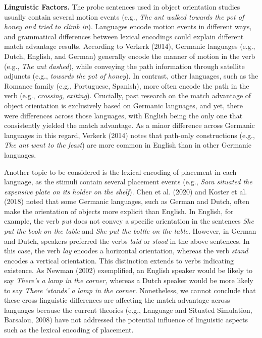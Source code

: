 \documentclass[
  man,floatsintext]{apa7}
\begin{document}
\textbf{Linguistic Factors.} The probe sentences used in object orientation
studies usually contain several motion events (e.g., \emph{The ant walked
towards the pot of honey and tried to climb in}). Languages encode
motion events in different ways, and grammatical differences between
lexical encodings could explain different match advantage results.
According to Verkerk (2014), Germanic languages (e.g., Dutch, English, and
German) generally encode the manner of motion in the verb (e.g., \emph{The
ant dashed}), while conveying the path information through satellite
adjuncts (e.g., \emph{towards the pot of honey}). In contrast, other
languages, such as the Romance family (e.g., Portuguese, Spanish), more
often encode the path in the verb (e.g., \emph{crossing}, \emph{exiting}).
Crucially, past research on the match advantage of object orientation is
exclusively based on Germanic languages, and yet, there were differences
across those languages, with English being the only one that
consistently yielded the match advantage. As a minor difference across
Germanic languages in this regard, Verkerk (2014) notes that path-only
constructions (e.g., \emph{The ant went to the feast}) are more common in
English than in other Germanic languages.

Another topic to be considered is the lexical encoding of placement in
each language, as the stimuli contain several placement events (e.g.,
\emph{Sara situated the expensive plate on its holder on the shelf}).
Chen et al. (2020) and Koster et al. (2018) noted that
some Germanic languages, such as German and Dutch, often make the
orientation of objects more explicit than English. In English, for
example, the verb \emph{put} does not convey a specific orientation in the
sentences \emph{She put the book on the table} and \emph{She put the bottle on the
table.} However, in German and Dutch, speakers preferred the verbs
\emph{laid} or \emph{stood} in the above sentences. In this case, the verb \emph{lay}
encodes a horizontal orientation, whereas the verb \emph{stand} encodes a
vertical orientation. This distinction extends to verbs indicating
existence. As Newman (2002) exemplified, an
English speaker would be likely to say \emph{There's a lamp in the corner,}
whereas a Dutch speaker would be more likely to say \emph{There `stands' a
lamp in the corner.} Nonetheless, we cannot conclude that these
cross-linguistic differences are affecting the match advantage across
languages because the current theories (e.g., Language and Situated
Simulation, Barsalou, 2008) have not addressed the potential influence of linguistic aspects such as the lexical encoding of placement.
\end{document}
